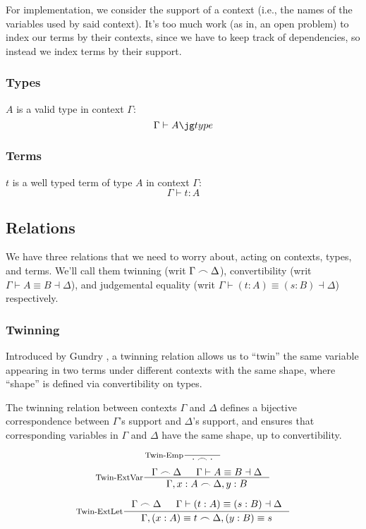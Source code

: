 For implementation, we consider the support of a context (i.e., the names of the variables used by said context).
It's too much work (as in, an open problem) to index our terms by their contexts, since we have to keep track of dependencies, so instead we index terms by their support.

\subsubsection{Types}
$A$ is a valid type in context $\Gamma$:
\[
  \Gamma \vdash \type{A}
\]

\subsubsection{Terms}
$t$ is a well typed term of type $A$ in context $\Gamma$:
\[
  \Gamma \vdash t : A
\]

\subsection{Relations}
We have three relations that we need to worry about, acting on contexts, types, and terms. We'll call them twinning (writ $\Gamma \frown \Delta$), convertibility (writ $\Gamma \vdash A \equiv B \dashv \Delta$), and judgemental equality (writ $\Gamma \vdash (t : A) \equiv (s : B) \dashv \Delta$) respectively.

\subsubsection{Twinning}
Introduced by Gundry \cite{gundry2013TypeInferenceHaskell} \cite{gundry2013TutorialImplementationDynamic}, a twinning relation allows us to ``twin'' the same variable appearing in two terms under different contexts with the same shape, where ``shape'' is defined via convertibility on types.

The twinning relation between contexts $\Gamma$ and $\Delta$ defines a bijective correspondence between $\Gamma$'s support and $\Delta$'s support, and ensures that corresponding variables in $\Gamma$ and $\Delta$ have the same shape, up to convertibility.

\[
  \inference[Twin-Emp]{}{\cdot \frown \cdot}
\]
\[
  \inference[Twin-ExtVar]
    { \Gamma \frown \Delta
    & \Gamma \vdash A \equiv B \dashv \Delta
    }
    { \Gamma, x : A \frown \Delta, y : B }
\]

\[
  \inference[Twin-ExtLet]
  { \twin{\Gamma}{\Delta}
  & \Gamma \vdash (t : A) \equiv (s : B) \dashv \Delta
  }
  {\twin{\Gamma, (x : A) \equiv t}{\Delta, (y : B) \equiv s}}
\]


